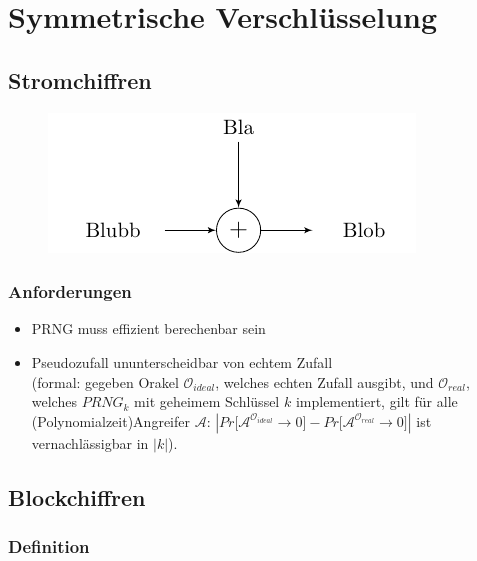 \documentclass[a4paper,twoside,DIV15,BCOR12mm]{scrbook}
\begin{document}
	
\chapter{Symmetrische Verschlüsselung}


\section{Stromchiffren}

\begin{figure}[htb]
\includegraphics[scale=1]{stromchiffre.pdf}
\end{figure}

\subsection{Anforderungen}
	\begin{itemize}
		\item PRNG muss effizient berechenbar sein
		\item Pseudozufall ununterscheidbar von echtem Zufall\\ (formal: gegeben Orakel $\mathcal{O}_{ideal}$, welches echten Zufall ausgibt, und $\mathcal{O}_{real}$, welches ${PRNG}_k$ mit geheimem Schlüssel $k$ implementiert, gilt für alle (Polynomialzeit)Angreifer $\mathcal{A}$: $\left| Pr\lbrack \mathcal{A}^{\mathcal{O}_{ideal}} \rightarrow 0 \rbrack - Pr\lbrack \mathcal{A}^{\mathcal{O}_{real}} \rightarrow 0 \rbrack \right|$ ist vernachlässigbar in $\left| k \right|$).
	\end{itemize}
	
\section{Blockchiffren}

\subsection{Definition}
\end{document}
